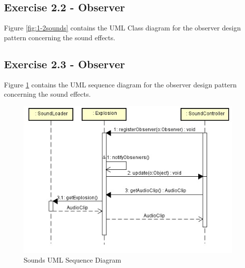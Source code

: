 \newpage

\subsection{Exercise 2.2 - Observer}
Figure \ref{fig:1-2sounds} contains the UML Class diagram for the observer design pattern concerning the sound effects.

\subsection{Exercise 2.3 - Observer}
Figure \ref{fig:2-3sounds} contains the UML sequence diagram for the observer design pattern concerning the sound effects.
\begin{figure}[ht!]
\centering
\includegraphics[width=13cm]{soundsSequence.jpg}
\caption{Sounds UML Sequence Diagram}
\label{fig:2-3sounds}
\end{figure}